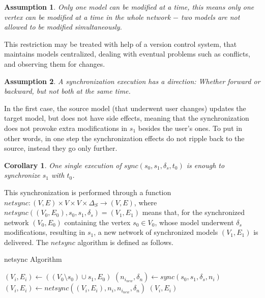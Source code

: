 \documentclass[tuberlin,cic,tc,english,noabntcite,oneside]{iiufrgs}
\begin{document}
\newtheorem{assumption}{Assumption}
\begin{assumption}
	Only one model can be modified at a time, this means only one vertex can be modified at a time in the whole network $-$ two models are not allowed to be modified simultaneously.
\end{assumption}

This restriction may be treated with help of a version control system, that maintains models centralized, dealing with eventual problems such as conflicts, and observing them for changes.

\begin{assumption}
\label{ass:direcetion}
	A synchronization execution has a direction: Whether forward or backward, but not both at the same time.
\end{assumption}

In the first case, the source model (that underwent user changes) updates the target model, but does not have side effects, meaning that the synchronization does not provoke extra modifications in $s_1$ besides the user's ones. To put in other words, in one step the synchronization effects do not ripple back to the source, instead they go only further.

\newtheorem{corollary}{Corollary}
\begin{corollary}
\label{cor:onestep_sync}
	One single execution of $sync (s_0, s_1, \delta_s, t_0)$ is enough to synchronize $s_1$ with $t_0$.
\end{corollary}

This synchronization is performed through a function $netsync: (V,E) \times V \times V \times \Delta_S \rightarrow (V,E)$, where $netsync ((V_0,E_0), s_0, s_1, \delta_s) = (V_1,E_1)$ means that, for the synchronized network $(V_0,E_0)$ containing the vertex $s_0 \in V_0$, whose model underwent $\delta_s$ modifications, resulting in $s_1$, a new network of synchronized models $(V_1,E_1)$ is delivered. The $netsync$ algorithm is defined as follows.

\begin{algorithm}[H]
	\caption{netsync Algorithm}
	\begin{algorithmic}[1]
		\State $(V_i,E_i) \leftarrow ((V_0 \setminus s_0) \cup s_1, E_0)$ 
			\State $(n_{i_{new}}, \delta_n) \leftarrow sync(s_0, s_1, \delta_s, n_i)$ 
			 
				\State $(V_i,E_i) \leftarrow netsync((V_i,E_i), n_i, n_{i_{new}}, \delta_n)$ 
			\EndIf
		\EndFor
		\State \Return $(V_i, E_i)$
		\EndFunction
	\end{algorithmic}
\end{algorithm}
\end{document}
